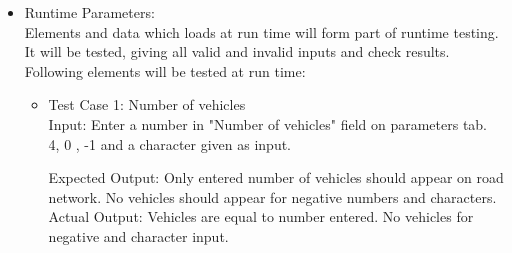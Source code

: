 \documentclass[11pt, oneside]{article}   	%
\begin{document}
\begin{itemize}
\begin{enumerate}
 \end{enumerate}
\item Runtime Parameters: \hfill \\
Elements and data which loads at run time will form part of runtime testing. It will be tested, giving all valid and invalid inputs and check results. Following elements will be tested at run time:
\begin{itemize}
\item Test Case 1: Number of vehicles\hfill \\
Input: Enter a number in "Number of vehicles" field on parameters tab.\hfill \\
4, 0 , -1 and a character given as input.

Expected Output: Only entered number of vehicles should appear on road network. No vehicles should appear for negative numbers and characters. \hfill \\
Actual Output:  Vehicles are equal to number entered. No vehicles for negative and character input.\hfil \\


\end{itemize}
\end{itemize}
\end{document}
